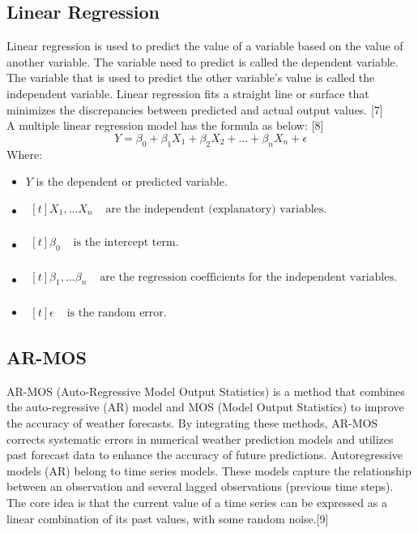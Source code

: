 \documentclass{ieeeojies}
\begin{document}
\subsection{Linear Regression}
Linear regression is used to predict the value of a variable based on the value of another variable. The variable need to predict is called the dependent variable. The variable that is used to predict the other variable's value is called the independent variable. Linear regression fits a straight line or surface that minimizes the discrepancies between predicted and actual output values. [7] \\
A multiple linear regression model has the formula as below: [8]
\[ Y = \beta_0 + \beta_1X_1 + \beta_2X_2 +...+ \beta_nX_n + \epsilon\]
Where:
\begin{itemize}
    \item $Y$ is the dependent or predicted variable.
    \item $\begin{aligned}[t]
            X_1,...X_n & \text{ are the independent (explanatory) variables.} \\
            \end{aligned}$
    \item $\begin{aligned}[t]
            \beta_0 & \text{ is the intercept term.} \\
            \end{aligned}$
    \item $\begin{aligned}[t]
            \beta_1,...\beta_n & \text{ are the regression coefficients for the independent variables.} \\
            \end{aligned}$
    \item $\begin{aligned}[t]
            \epsilon & \text{ is the random error.}
            \end{aligned}$        
\end{itemize}
\subsection{AR-MOS}
\indent AR-MOS (Auto-Regressive Model Output Statistics) is a method that combines the auto-regressive (AR) model and MOS (Model Output Statistics) to improve the accuracy of weather forecasts. By integrating these methods, AR-MOS corrects systematic errors in numerical weather prediction models and utilizes past forecast data to enhance the accuracy of future predictions. 
\indent Autoregressive models (AR) belong to time series models. These models capture the relationship between an observation and several lagged observations (previous time steps). The core idea is that the current value of a time series can be expressed as a linear combination of its past values, with some random noise.[9]
\end{document}
